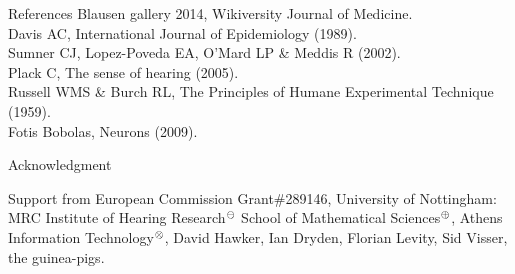 \documentclass[paperwidth=75cm,paperheight=116.18cm,fontscale=0.40]{baposter}
\def\computer{/Users/pmxal9/}
\def\computer{/Users/pmaal/}
\edef\drop{\computer Dropbox/}
\def\SET{\drop Nottingham/SET/}
\begin{document}
\begin{poster}
\begin{posterbox}[name=References,column=2, span=1, below=Conclusion]{References} 
\footnotesize{%
\noindent [1] Blausen gallery 2014, Wikiversity Journal of Medicine.\\%
\noindent [2] Davis AC, International Journal of Epidemiology (1989). \\%
\noindent [3] Sumner CJ, Lopez-Poveda EA, O'Mard LP \& Meddis R (2002).\\%
\noindent [4] Plack C, The sense of hearing (2005).\\%
\noindent [5] Russell WMS \& Burch RL, The Principles of Humane Experimental Technique  (1959).\\
\noindent [BG] Fotis Bobolas, Neurons (2009).
}
\end{posterbox}

\begin{posterbox}[name=Acknowledgment,column=2, span=1, below=References]{Acknowledgment}
\normalsize
\noindent {}%
\footnotesize
\noindent Support from European Commission Grant\#289146, 
	University of Nottingham:\,%
	MRC Institute of Hearing Research${}^\ominus$ 
	School of Mathematical Sciences${}^\oplus$, 
	Athens Information Technology${}^\otimes$,
	David Hawker, Ian Dryden,  Florian Levity, Sid Visser, the guinea-pigs.
\end{posterbox}



\end{poster}
\end{document}
